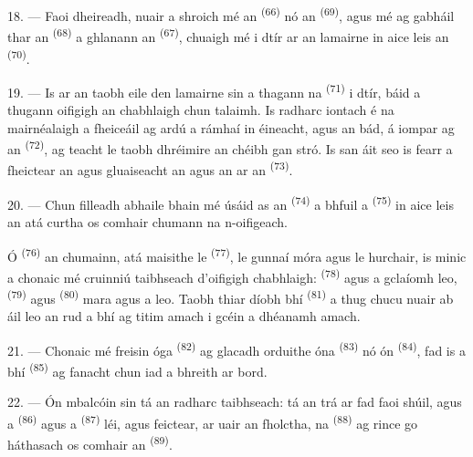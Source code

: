 18. --- Faoi dheireadh, nuair a shroich mé an 
\textsuperscript{(66)} nó an  \textsuperscript{(69)}, agus mé ag gabháil
thar an  \textsuperscript{(68)} a ghlanann an 
\textsuperscript{(67)}, chuaigh mé i dtír ar an lamairne in aice leis an
 \textsuperscript{(70)}.

19. --- Is ar an taobh eile den lamairne sin a thagann na 
\textsuperscript{(71)} i dtír, báid a thugann oifigigh an chabhlaigh chun talaimh. Is
radharc iontach é na mairnéalaigh a fheiceáil ag ardú a rámhaí in éineacht, agus an
bád, á iompar ag an  \textsuperscript{(72)}, ag teacht le taobh dhréimire
an chéibh gan stró. Is san áit seo is fearr a fheictear an  agus
gluaiseacht an  agus an  ar an 
\textsuperscript{(73)}.

\VUsaut{3.0mm}
\VUsaut{3.0mm}

20. --- Chun filleadh abhaile bhain mé úsáid as an 
\textsuperscript{(74)} a bhfuil a  \textsuperscript{(75)} in aice leis an
 atá curtha os comhair chumann na n-oifigeach.

Ó  \textsuperscript{(76)} an chumainn, atá maisithe le
 \textsuperscript{(77)}, le gunnaí móra agus le hurchair, is minic a
chonaic mé cruinniú taibhseach d'oifigigh chabhlaigh: 
\textsuperscript{(78)} agus a gclaíomh leo, 
\textsuperscript{(79)} agus  \textsuperscript{(80)} mara agus a
 leo. Taobh thiar díobh bhí 
\textsuperscript{(81)} a thug  chucu nuair ab áil leo an rud a
bhí ag titim amach i gcéin a dhéanamh amach.

21. --- Chonaic mé freisin  óga \textsuperscript{(82)} ag glacadh
orduithe óna  \textsuperscript{(83)} nó ón
 \textsuperscript{(84)}, fad is a bhí 
\textsuperscript{(85)} ag fanacht chun iad a bhreith ar bord.

22. --- Ón mbalcóin sin tá an radharc taibhseach: tá an trá ar fad faoi shúil, agus a
 \textsuperscript{(86)} agus a  \textsuperscript{(87)}
léi, agus feictear, ar uair an fholctha, na 
\textsuperscript{(88)} ag rince go háthasach os comhair an 
\textsuperscript{(89)}.

